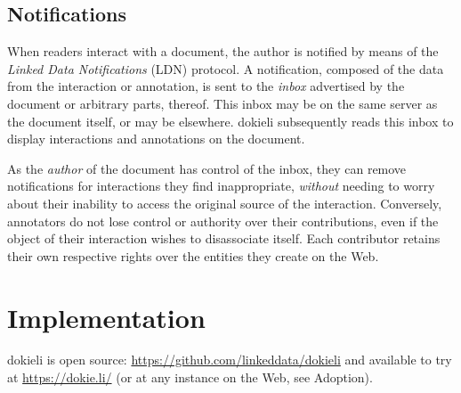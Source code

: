 \documentclass[a4paper]{llncs}
\begin{document}
                                    
                                
                            

                            
                                \subsection{Notifications}
  \label{notifications}

                                
                                    
\par When readers interact with a document, the author is notified by means of the \textit{Linked Data Notifications} (LDN) protocol. A notification, composed of the data from the interaction or annotation, is sent to the \textit{inbox} advertised by the document or arbitrary parts, thereof. This inbox may be on the same server as the document itself, or may be elsewhere. dokieli subsequently reads this inbox to display interactions and annotations on the document.

                                    
\par As the \textit{author} of the document has control of the inbox, they can remove notifications for interactions they find inappropriate, \textit{without} needing to worry about their inability to access the original source of the interaction. Conversely, annotators do not lose control or authority over their contributions, even if the object of their interaction wishes to disassociate itself. Each contributor retains their own respective rights over the entities they create on the Web.
                                
                            
                        
                    

                    
                        \section{Implementation}
  \label{implementation}

                        
                            
\par dokieli is open source: \url{https://github.com/linkeddata/dokieli} and available to try at \url{https://dokie.li/} (or at any instance on the Web, see \empty Adoption).
\end{document}
